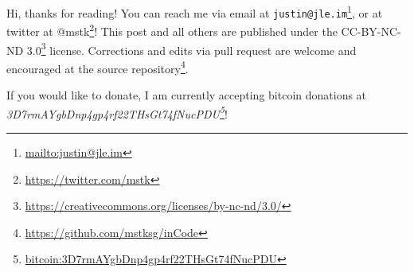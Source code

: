 \documentclass[]{article}
\renewcommand{\href}[2]{#2\footnote{\url{#1}}}
\begin{document}
Hi, thanks for reading! You can reach me via email at
\href{mailto:justin@jle.im}{\nolinkurl{justin@jle.im}}, or at twitter at
\href{https://twitter.com/mstk}{@mstk}! This post and all others are published
under the \href{https://creativecommons.org/licenses/by-nc-nd/3.0/}{CC-BY-NC-ND
3.0} license. Corrections and edits via pull request are welcome and encouraged
at \href{https://github.com/mstksg/inCode}{the source repository}.

If you would like to donate, I am currently accepting bitcoin donations at
\emph{\href{bitcoin:3D7rmAYgbDnp4gp4rf22THsGt74fNucPDU}{3D7rmAYgbDnp4gp4rf22THsGt74fNucPDU}}!
\end{document}
